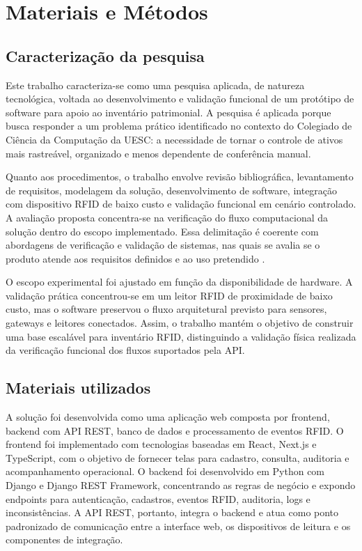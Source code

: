 \chapter{Materiais e Métodos}

\section{Caracterização da pesquisa}

Este trabalho caracteriza-se como uma pesquisa aplicada, de natureza tecnológica, voltada ao desenvolvimento e validação funcional de um protótipo de software para apoio ao inventário patrimonial. A pesquisa é aplicada porque busca responder a um problema prático identificado no contexto do Colegiado de Ciência da Computação da UESC: a necessidade de tornar o controle de ativos mais rastreável, organizado e menos dependente de conferência manual.

Quanto aos procedimentos, o trabalho envolve revisão bibliográfica, levantamento de requisitos, modelagem da solução, desenvolvimento de software, integração com dispositivo RFID de baixo custo e validação funcional em cenário controlado. A avaliação proposta concentra-se na verificação do fluxo computacional da solução dentro do escopo implementado. Essa delimitação é coerente com abordagens de verificação e validação de sistemas, nas quais se avalia se o produto atende aos requisitos definidos e ao uso pretendido \cite{ieee1012}.

O escopo experimental foi ajustado em função da disponibilidade de hardware. A validação prática concentrou-se em um leitor RFID de proximidade de baixo custo, mas o software preservou o fluxo arquitetural previsto para sensores, gateways e leitores conectados. Assim, o trabalho mantém o objetivo de construir uma base escalável para inventário RFID, distinguindo a validação física realizada da verificação funcional dos fluxos suportados pela API.

\section{Materiais utilizados}

A solução foi desenvolvida como uma aplicação web composta por frontend, backend com API REST, banco de dados e processamento de eventos RFID. O frontend foi implementado com tecnologias baseadas em React, Next.js e TypeScript, com o objetivo de fornecer telas para cadastro, consulta, auditoria e acompanhamento operacional. O backend foi desenvolvido em Python com Django e Django REST Framework, concentrando as regras de negócio e expondo endpoints para autenticação, cadastros, eventos RFID, auditoria, logs e inconsistências. A API REST, portanto, integra o backend e atua como ponto padronizado de comunicação entre a interface web, os dispositivos de leitura e os componentes de integração.

